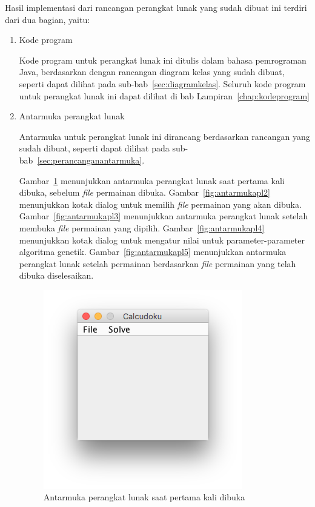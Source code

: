 Hasil implementasi dari rancangan perangkat lunak yang sudah dibuat ini terdiri dari dua bagian, yaitu:

\begin{enumerate}
\item Kode program

Kode program untuk perangkat lunak ini ditulis dalam bahasa pemrograman Java, berdasarkan dengan rancangan diagram kelas yang sudah dibuat, seperti dapat dilihat pada sub-bab~\ref{sec:diagramkelas}. Seluruh kode program untuk perangkat lunak ini dapat dilihat di bab Lampiran~\ref{chap:kodeprogram}

\item Antarmuka perangkat lunak

Antarmuka untuk perangkat lunak ini dirancang berdasarkan rancangan yang sudah dibuat, seperti dapat dilihat pada sub-bab~\ref{sec:perancanganantarmuka}.

Gambar~\ref{fig:antarmukapl1} menunjukkan antarmuka perangkat lunak saat pertama kali dibuka, sebelum \textit{file} permainan dibuka. Gambar~\ref{fig:antarmukapl2} menunjukkan kotak dialog untuk memilih \textit{file} permainan yang akan dibuka. Gambar~\ref{fig:antarmukapl3} menunjukkan antarmuka perangkat lunak setelah membuka \textit{file} permainan yang dipilih. Gambar~\ref{fig:antarmukapl4} menunjukkan kotak dialog untuk mengatur nilai untuk parameter-parameter algoritma genetik. Gambar~\ref{fig:antarmukapl5} menunjukkan antarmuka perangkat lunak setelah permainan berdasarkan \textit{file} permainan yang telah dibuka diselesaikan.

\begin{figure}
\centering
\captionsetup{justification=centering}
\includegraphics[scale=0.5]{Gambar/ImplementasiPengujian/Calcudoku1.png}
\caption[Antarmuka perangkat lunak saat pertama kali dibuka]{Antarmuka perangkat lunak saat pertama kali dibuka}
\label{fig:antarmukapl1}
\end{figure}


\end{enumerate}
